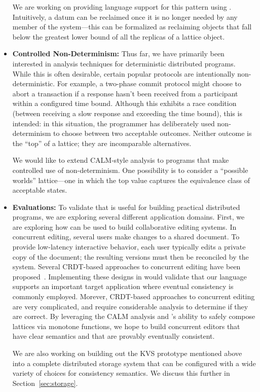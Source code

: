\begin{itemize}
  We are working on providing language support for this pattern using
  \blooml. Intuitively, a datum can be reclaimed once it is no longer needed by
  any member of the system---this can be formalized as reclaiming objects that
  fall below the greatest lower bound of all the replicas of a lattice object.  

\item \textbf{Controlled Non-Determinism:} Thus far, we have primarily been
  interested in analysis techniques for deterministic distributed
  programs. While this is often desirable,
  certain popular protocols are intentionally
  non-deterministic. For example, a two-phase commit protocol might choose to
  abort a transaction if a response hasn't been received from a participant
  within a configured time bound. Although this exhibits a race condition
  (between receiving a slow response and exceeding the time bound), this is
  intended: in this situation, the programmer has deliberately used
  non-determinism to choose between two acceptable outcomes. Neither outcome is the ``top'' of a lattice; they are incomparable alternatives.

  We would like to extend CALM-style analysis to programs that make
  controlled use of non-determinism.  One possibility is to consider a ``possible worlds'' lattice---one in which the top value captures the equivalence class of acceptable states.  

\item \textbf{Evaluations:} To validate that \blooml is useful for building
  practical distributed programs, we are exploring several different application
  domains. First, we are exploring how \blooml can be used to build
  collaborative editing systems. In concurrent editing, several users make
  changes to a shared document. To provide low-latency interactive behavior,
  each user typically edits a private copy of the document; the resulting
  versions must then be reconciled by the system.
  Several CRDT-based approaches to concurrent editing have been
  proposed~\cite{Oster2006,Preguica2009,Weiss2009,Weiss2010}. Implementing these designs
  in \blooml would validate that our language supports an important target
  application where eventual consistency is commonly employed. Morever,
  CRDT-based approaches to concurrent editing are very complicated, and require
  considerable analysis to determine if they are correct. By leveraging the CALM
  analysis and \blooml's ability to safely compose lattices via monotone
  functions, we hope to build concurrent editors that have clear semantics and
  that are provably eventually consistent.

  We are also working on building out the KVS prototype mentioned above into a
  complete distributed storage system that can be configured with a wide variety of choices for consistency semantics.  We discuss this further in Section~\ref{sec:storage}.
\end{itemize}

